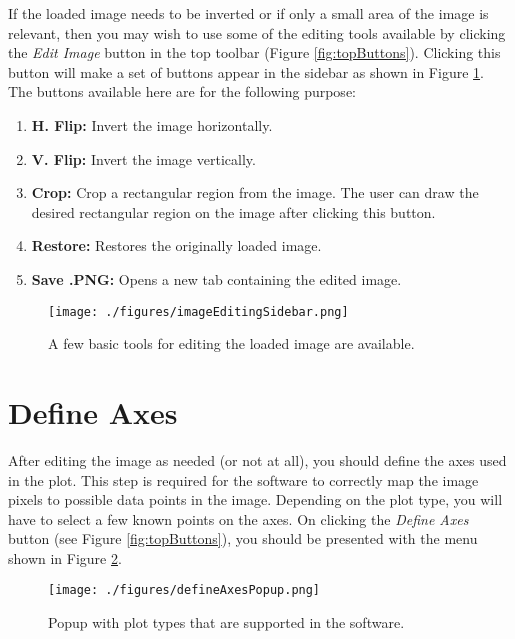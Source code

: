 \documentclass[letterpaper, 10pt]{article}
\begin{document}
If the loaded image needs to be inverted or if only a small area of the image is relevant, then you may wish to use some of the editing tools available by clicking the \emph{Edit Image} button in the top toolbar (Figure \ref{fig:topButtons}). Clicking this button will make a set of buttons appear in the sidebar as shown in Figure \ref{fig:imageEditingSidebar}. The buttons available here are for the following purpose:
\begin{enumerate}
\item{{\bf H. Flip:} Invert the image horizontally.}
\item{{\bf V. Flip:} Invert the image vertically.}
\item{{\bf Crop:} Crop a rectangular region from the image. The user can draw the desired rectangular region on the image after clicking this button.}
\item{{\bf Restore: } Restores the originally loaded image.}
\item{{\bf Save .PNG:} Opens a new tab containing the edited image.}
 
\end{enumerate}




\begin{figure}
\begin{center}
\texttt{[image: ./figures/imageEditingSidebar.png]}
\caption{A few basic tools for editing the loaded image are available.}
\label{fig:imageEditingSidebar}
\end{center}
\end{figure}


\section{Define Axes}

After editing the image as needed (or not at all),  you should define the axes used in the plot. This step is required for the software to correctly map the image pixels to possible data points in the image. Depending on the plot type, you will have to select a few known points on the axes. On clicking the \emph{Define Axes} button (see Figure \ref{fig:topButtons}), you should be presented with the menu shown in Figure \ref{fig:defineAxesPopup}.
\begin{figure}
\begin{center}
\texttt{[image: ./figures/defineAxesPopup.png]}
\caption{Popup with plot types that are supported in the software.}
\label{fig:defineAxesPopup}
\end{center}
\end{figure}
\end{document}
